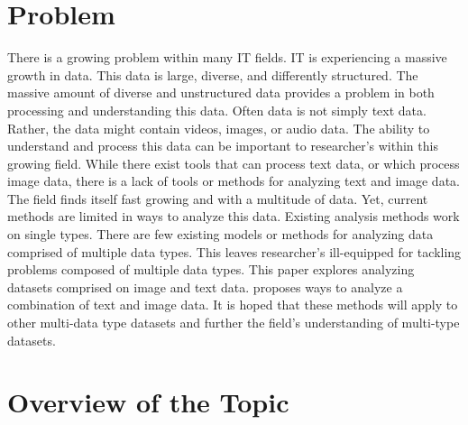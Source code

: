 
\chapter{Problem}
There is a growing problem within many IT fields.  IT is experiencing a massive growth in data.  This data is large, diverse, and differently structured.  The massive amount of diverse and unstructured data provides a problem in both processing and understanding this data.  Often data is not simply text data.  Rather, the data might contain videos, images, or audio data.  The ability to understand and process this data can be important to researcher's within this growing field.  While there exist tools that can process text data, or which process image data, there is a lack of tools or methods for analyzing text and image data.  The field finds itself fast growing and with a multitude of data.  Yet, current methods are limited in ways to analyze this data.  Existing analysis methods work on single types.  There are few existing models or methods for analyzing data comprised of multiple data types.  This leaves researcher's ill-equipped for tackling problems composed of multiple data types.  This paper explores analyzing datasets comprised on image and text data.  proposes ways to analyze a combination of text and image data.  It is hoped that these methods will apply to other multi-data type datasets and further the field's understanding of multi-type datasets.  

\chapter{Overview of the Topic}

